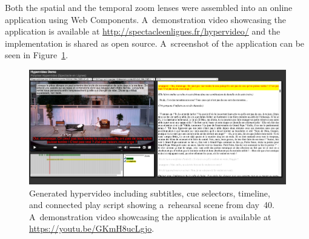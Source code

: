 \documentclass[conference]{IEEEtran}
\newcommand{\todo}[1]{\noindent\textcolor{red}{{\bf \{ToDo} #1{\bf \}}}}
\begin{document}
Both the spatial and the temporal zoom lenses were assembled into 
an online  application using Web Components. A~demonstration video showcasing the application is available at
\url{http://spectacleenlignes.fr/hypervideo/}
and the implementation is  shared as open source. A~screenshot of the application can be seen in Figure~\ref{fig:screenshot}.

\begin{figure}[htb!]
  \centering
  \includegraphics[width=0.95\linewidth]{screenshot}
  \caption{Generated hypervideo including subtitles, cue selectors, timeline, and connected play script
    showing a~rehearsal scene from day~40. A~demonstration video showcasing the application is available at
\url{https://youtu.be/GKmH8ucLgjo}.}
  \label{fig:screenshot}
\end{figure}





\end{document}
